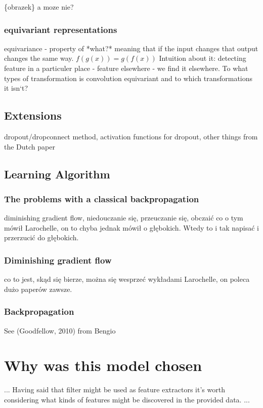 \documentclass[a4paper,10pt]{report}
\begin{document}
	  \{obrazek\} a moze nie?
	  
	\subsubsection{equivariant representations} %
	  equivariance - property of *what?* meaning that if the input changes that output changes the same way. $f(g(x)) = g(f(x))$ Intuition about it: detecting feature in a particuler place - feature elsewhere - we find it elsewhere. To what types of transformation is convolution equivariant and to which transformations it isn`t?\\
	  
	  \subsection{Extensions} %
	dropout/dropconnect method, activation functions for dropout, other things from the Dutch paper\\
	
	\subsection{Learning Algorithm} %
	
	
	\subsubsection{The problems with a classical backpropagation} %
	  diminishing gradient flow, niedouczanie się, przeuczanie się, obczaić co o tym mówił Larochelle, on to chyba jednak mówił o głębokich. Wtedy to i tak napisać i przerzucić do głębokich.\\
	
	\subsubsection{Diminishing gradient flow} %
	  co to jest, skąd się bierze, można się wesprzeć wykładami Larochelle, on poleca dużo paperów zawsze.\\
	  
	\subsubsection{Backpropagation} %
	  See (Goodfellow, 2010) from Bengio\\
	
	
	    \section{Why was this model chosen}
	... Having said that filter might be used as feature extractors it's worth considering what kinds of features might be discovered in the provided data. ...\\
	

    
\end{document}

